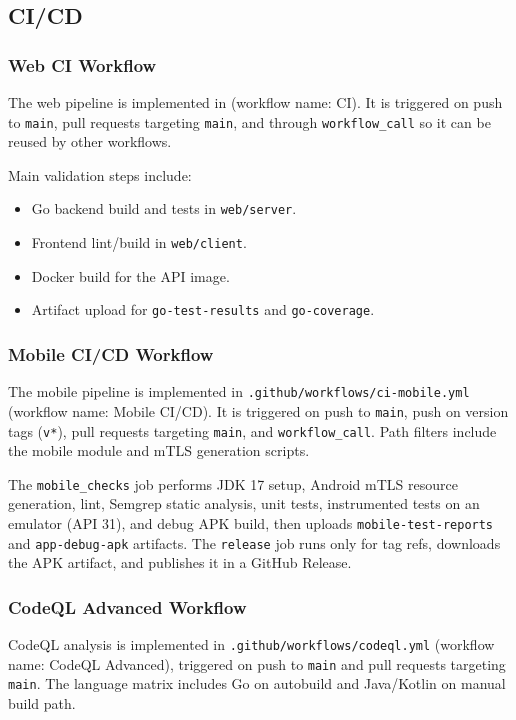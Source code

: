 \documentclass[12pt,a4paper]{article}
\begin{document}
\subsection{CI/CD}
\subsubsection{Web CI Workflow}
The web pipeline is implemented in
 (workflow name: CI). It is triggered on
push to \texttt{main}, pull requests targeting \texttt{main}, and through
\texttt{workflow\_call} so it can be reused by other workflows.

Main validation steps include:
\begin{itemize}[leftmargin=*]
    \item Go backend build and tests in \texttt{web/server}.
    \item Frontend lint/build in \texttt{web/client}.
    \item Docker build for the API image.
    \item Artifact upload for \texttt{go-test-results} and
    \texttt{go-coverage}.
\end{itemize}

\subsubsection{Mobile CI/CD Workflow}
The mobile pipeline is implemented in
\texttt{.github/workflows/ci-mobile.yml} (workflow name: Mobile CI/CD). It is
triggered on push to \texttt{main}, push on version tags
(\texttt{v*}), pull requests targeting \texttt{main}, and
\texttt{workflow\_call}. Path filters include the mobile module and mTLS
generation scripts.

The \texttt{mobile\_checks} job performs JDK 17 setup, Android mTLS resource
generation, lint, Semgrep static analysis, unit tests, instrumented tests on
an emulator (API 31), and debug APK build, then uploads
\texttt{mobile-test-reports} and \texttt{app-debug-apk} artifacts. The
\texttt{release} job runs only for tag refs, downloads the APK artifact, and
publishes it in a GitHub Release.

\subsubsection{CodeQL Advanced Workflow}
CodeQL analysis is implemented in
\texttt{.github/workflows/codeql.yml} (workflow name: CodeQL Advanced),
triggered on push to \texttt{main} and pull requests targeting
\texttt{main}. The language matrix includes Go on autobuild and Java/Kotlin on manual build path.
\end{document}
